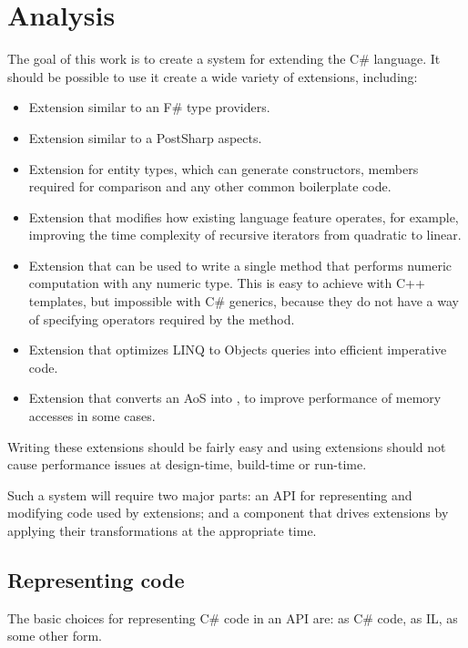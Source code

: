 \chapter{Analysis}

The goal of this work is to create a system for extending the C\# language. It should be possible to use it create a wide variety of extensions, including:

\begin{itemize}
\item Extension similar to an F\# type providers.
\item Extension similar to a PostSharp aspects.
\item Extension for entity types, which can generate constructors, members required for comparison and any other common boilerplate code.
\item Extension that modifies how existing language feature operates, for example, improving the time complexity of recursive iterators from quadratic to linear.
\item Extension that can be used to write a single method that performs numeric computation with any numeric type. This is easy to achieve with C++ templates, but impossible with C\# generics, because they do not have a way of specifying operators required by the method.
\item Extension that optimizes LINQ to Objects queries into efficient imperative code.
\item Extension that converts an \ac{AoS} into , to improve performance of memory accesses in some cases.
\end{itemize}


Writing these extensions should be fairly easy and using extensions should not cause performance issues at design-time, build-time or run-time.

\medskip

Such a system will require two major parts: an \ac{API} for representing and modifying code used by extensions; and a component that drives extensions by applying their transformations at the appropriate time.

\section{Representing code}
\label{representing-code}

The basic choices for representing C\# code in an \ac{API} are: as C\# code, as \ac{IL}, as some other form.

